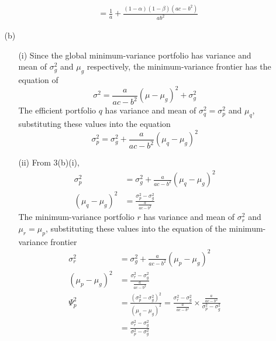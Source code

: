 \documentclass{article}
\begin{document}
\begin{enumerate}
\begin{itemize}
\begin{itemize}
\begin{align*}
&=\frac{1}{a}+\frac{(1-\alpha)(1-\beta)(ac-b^2)}{ab^2}
\end{align*}
\end{itemize}
\item[(b)]
\begin{itemize}
\item[(i)]
Since the global minimum-variance portfolio has variance and mean of $\sigma^2_g$ and $\mu_g$ respectively, the minimum-variance frontier has the equation of 
\[\sigma^2=\frac{a}{ac-b^2}(\mu-\mu_g)^2+\sigma_g^2\]
The efficient portfolio $q$ has variance and mean of $\sigma^2_q=\sigma^2_p$ and $\mu_q$, substituting these values into the equation
\[\sigma_p^2=\sigma_g^2+\frac{a}{ac-b^2}(\mu_q-\mu_g)^2\]
\item[(ii)]
From 3(b)(i),
\begin{align*}
\sigma_p^2&=\sigma_g^2+\frac{a}{ac-b^2}(\mu_q-\mu_g)^2 \\
(\mu_q-\mu_g)^2&=\frac{\sigma_p^2-\sigma_g^2}{\frac{a}{ac-b^2}}
\end{align*}
The minimum-variance portfolio $r$ has variance and mean of $\sigma_r^2$ and $\mu_r=\mu_p$, substituting these values into the equation of the minimum-variance frontier
\begin{align*}
\sigma_r^2&=\sigma_g^2+\frac{a}{ac-b^2}(\mu_p-\mu_g)^2 \\
(\mu_p-\mu_g)^2&=\frac{\sigma_r^2-\sigma_g^2}{\frac{a}{ac-b^2}} \\
\Psi_p^2&=\frac{(\sigma_p^2-\sigma_g^2)^2}{(\mu_q-\mu_g)^2}=\frac{\sigma_r^2-\sigma_g^2}{\frac{a}{ac-b^2}} \times \frac{\frac{a}{ac-b^2}}{\sigma_p^2-\sigma_g^2} \\
&=\frac{\sigma_r^2-\sigma_g^2}{\sigma_p^2-\sigma_g^2}
\end{align*}
\end{itemize}
\end{itemize}
\end{enumerate}
\end{document}
